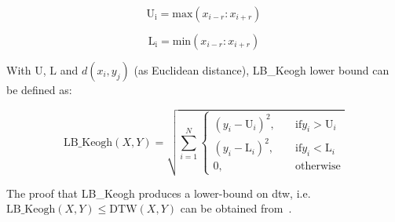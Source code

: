 \begin{equation}
	\mathrm{U_i} = \mathrm{max}(x_{i-r}:x_{i+r})
\end{equation}

\begin{equation}
\mathrm{\mathrm{L}_i} = \mathrm{min}(x_{i-r}:x_{i+r})
\end{equation}

With $\mathrm{U}$, $\mathrm{L}$ and $d(x_i, y_j)$ (as Euclidean distance), LB\_Keogh lower bound can be defined as:

\begin{equation}
	\mathrm{LB\_Keogh}(X,Y) = \sqrt{\sum_{i=1}^{N}{\begin{cases}
			(y_i - \mathrm{U}_i)^2, & \quad \text{if} y_i > \mathrm{U}_i\\
			(y_i - \mathrm{L}_i)^2, & \quad \text{if} y_i < \mathrm{L}_i\\			
			0, & \quad \mathrm{otherwise}			
			\end{cases}}}
\end{equation}

The proof that LB\_Keogh produces a lower-bound on \gls{dtw}, i.e.~$\mathrm{LB\_Keogh}(X,Y) \leq \mathrm{DTW}(X,Y)$ can be obtained from~\cite{Keogh2004}.



